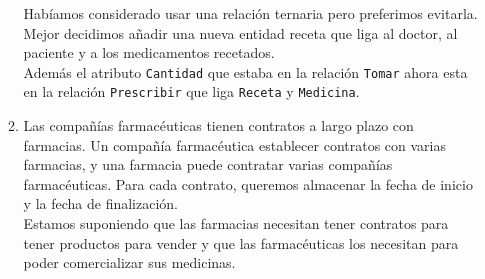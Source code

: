 \documentclass[12pt,a4paper]{article}
\begin{document}
\begin{enumerate}
\begin{enumerate}
				Habíamos considerado usar una relación ternaria pero preferimos evitarla.
				Mejor decidimos añadir una nueva entidad receta que liga al doctor, al paciente y a los medicamentos recetados.\\

				Además el atributo \texttt{Cantidad} que estaba en la relación \texttt{Tomar} ahora esta
				en la relación \texttt{Prescribir} que liga \texttt{Receta} y \texttt{Medicina}.\\

			\item Las compañías farmacéuticas tienen contratos a largo plazo con farmacias. Un compañía farmacéutica establecer
				contratos con varias farmacias, y una farmacia puede contratar varias compañías farmacéuticas. Para cada
				contrato, queremos almacenar la fecha de inicio y la fecha de finalización.\\

				Estamos suponiendo que las farmacias necesitan tener contratos para tener productos para vender y
				que las farmacéuticas los necesitan para poder comercializar sus medicinas.\\

		\end{enumerate}
\end{enumerate}
\end{document}
